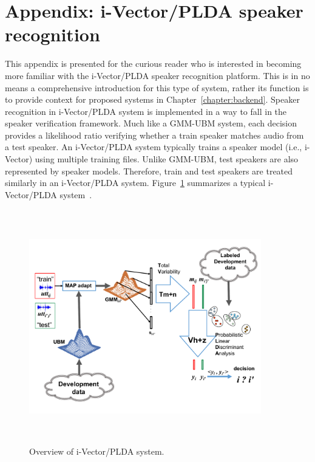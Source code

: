 \chapter*{Appendix: i-Vector/PLDA speaker recognition}
\label{appendix:ivector_plda_spkr_id}

This appendix is presented for the curious reader who is interested in becoming more familiar with the i-Vector/PLDA speaker recognition platform. 
This is in no means a comprehensive introduction for this type of system, rather its function is to provide context for proposed systems in Chapter~\ref{chapter:backend}. 
Speaker recognition in i-Vector/PLDA system is implemented in a way to fall in the speaker verification framework. 
Much like a GMM-UBM system, each decision provides a likelihood ratio verifying whether a train speaker matches audio from a test speaker. 
An i-Vector/PLDA system typically trains a speaker model (i.e., i-Vector) using multiple training files. 
Unlike GMM-UBM, test speakers are also represented by speaker models. 
Therefore, train and test speakers are treated similarly in an i-Vector/PLDA system. 
Figure~\ref{fig:ivector_plda} summarizes a typical i-Vector/PLDA system~\cite{dehak2011front}. 

\renewcommand{\thefigure}{A.\arabic{figure}}
\setcounter{figure}{0}
\begin{figure}[h!]
	\centering
	\vspace{0mm} 
	\includegraphics[height = 4in, width=0.9\textwidth]{figures/ivector_plda}
	\vspace{-3mm}
	\caption{Overview of i-Vector/PLDA system.}
	\label{fig:ivector_plda}
	\vspace{-3mm}
\end{figure}

